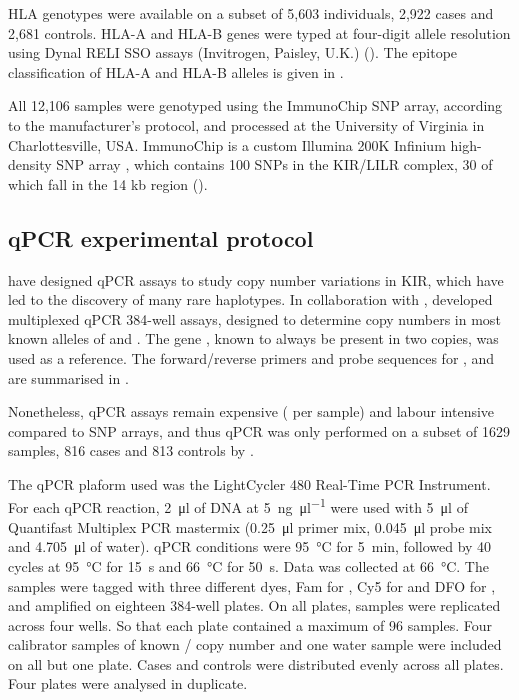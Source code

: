 HLA genotypes were available on a subset of 5,603 individuals, 2,922 cases and 2,681 controls.
HLA-A and HLA-B genes were typed at four-digit allele resolution using Dynal RELI SSO assays (Invitrogen, Paisley, U.K.) ().
The epitope classification of HLA-A and HLA-B alleles is given in .

All 12,106 samples were genotyped using the ImmunoChip SNP array,
according to the manufacturer's protocol, and processed at the University of Virginia in Charlottesville, USA.
ImmunoChip is a custom Illumina 200K Infinium high-density SNP array \citep{Nikula:2005bh}, which
contains 100 SNPs in the KIR/LILR complex, 30 of which fall in the 14 kb  region ().



\subsection{qPCR experimental protocol}

\citet{Jiang:2012cf} have designed \gls{qPCR}
assays to study copy number variations in KIR, which have led to the discovery of many rare haplotypes.
In collaboration with \citet{Jiang:2012cf},  developed multiplexed qPCR 384-well assays,
designed to determine copy numbers in most known alleles of  and .
The gene , known to always be present in two copies, was used as a reference.
The forward/reverse primers and probe sequences for ,  and  are summarised in .

Nonetheless, qPCR assays remain expensive ( per sample) and labour intensive compared to SNP arrays,
and thus qPCR was only performed on a subset of 1629 samples, 816 cases and 813 controls by .

The qPCR plaform used was the LightCycler 480 Real-Time PCR Instrument.
For each qPCR reaction, \SI{2}{\micro\litre} of DNA at \SI{5}{\nano\gram\per\micro\litre} were used with \SI{5}{\micro\litre} of Quantifast Multiplex PCR mastermix (\SI{0.25}{\micro\litre} primer mix, \SI{0.045}{\micro\litre} probe mix and \SI{4.705}{\micro\litre} of water).
qPCR conditions were \SI{95}{\degreeCelsius} for \SI{5}{\minute}, followed by 40 cycles at \SI{95}{\degreeCelsius} for \SI{15}{\second} and \SI{66}{\degreeCelsius} for \SI{50}{\second}.
Data was collected at \SI{66}{\degreeCelsius}.
The samples were tagged with three different dyes, Fam for , Cy5 for  and DFO for , and amplified on eighteen 384-well plates.
On all plates, samples were replicated across four wells.
So that each plate contained a maximum of 96 samples.
Four calibrator samples of known / copy number and one water sample were included on all but one plate.
Cases and controls were distributed evenly across all plates.
Four plates were analysed in duplicate.

